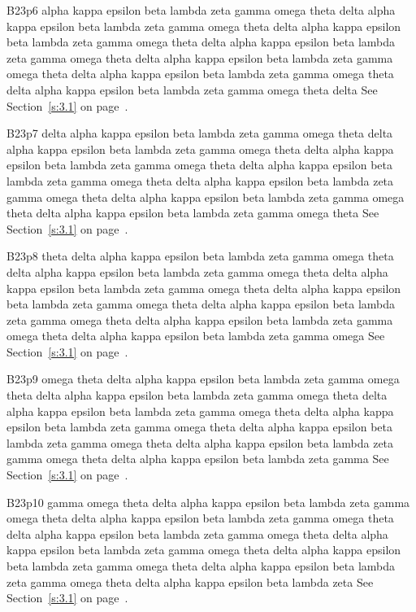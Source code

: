 B23p6 alpha kappa epsilon beta lambda zeta gamma omega theta delta alpha kappa epsilon beta lambda zeta gamma omega theta delta alpha kappa epsilon beta lambda zeta gamma omega theta delta alpha kappa epsilon beta lambda zeta gamma omega theta delta alpha kappa epsilon beta lambda zeta gamma omega theta delta alpha kappa epsilon beta lambda zeta gamma omega theta delta alpha kappa epsilon beta lambda zeta gamma omega theta delta See Section~\ref{s:3.1} on page~\pageref{s:3.1}.

B23p7 delta alpha kappa epsilon beta lambda zeta gamma omega theta delta alpha kappa epsilon beta lambda zeta gamma omega theta delta alpha kappa epsilon beta lambda zeta gamma omega theta delta alpha kappa epsilon beta lambda zeta gamma omega theta delta alpha kappa epsilon beta lambda zeta gamma omega theta delta alpha kappa epsilon beta lambda zeta gamma omega theta delta alpha kappa epsilon beta lambda zeta gamma omega theta See Section~\ref{s:3.1} on page~\pageref{s:3.1}.

B23p8 theta delta alpha kappa epsilon beta lambda zeta gamma omega theta delta alpha kappa epsilon beta lambda zeta gamma omega theta delta alpha kappa epsilon beta lambda zeta gamma omega theta delta alpha kappa epsilon beta lambda zeta gamma omega theta delta alpha kappa epsilon beta lambda zeta gamma omega theta delta alpha kappa epsilon beta lambda zeta gamma omega theta delta alpha kappa epsilon beta lambda zeta gamma omega See Section~\ref{s:3.1} on page~\pageref{s:3.1}.

B23p9 omega theta delta alpha kappa epsilon beta lambda zeta gamma omega theta delta alpha kappa epsilon beta lambda zeta gamma omega theta delta alpha kappa epsilon beta lambda zeta gamma omega theta delta alpha kappa epsilon beta lambda zeta gamma omega theta delta alpha kappa epsilon beta lambda zeta gamma omega theta delta alpha kappa epsilon beta lambda zeta gamma omega theta delta alpha kappa epsilon beta lambda zeta gamma See Section~\ref{s:3.1} on page~\pageref{s:3.1}.

B23p10 gamma omega theta delta alpha kappa epsilon beta lambda zeta gamma omega theta delta alpha kappa epsilon beta lambda zeta gamma omega theta delta alpha kappa epsilon beta lambda zeta gamma omega theta delta alpha kappa epsilon beta lambda zeta gamma omega theta delta alpha kappa epsilon beta lambda zeta gamma omega theta delta alpha kappa epsilon beta lambda zeta gamma omega theta delta alpha kappa epsilon beta lambda zeta See Section~\ref{s:3.1} on page~\pageref{s:3.1}.

